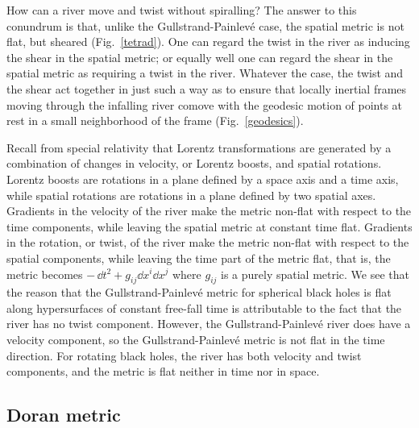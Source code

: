 \documentclass[twocolumn,showpacs,preprintnumbers,amsmath,amssymb,prb]{revtex4}
\begin{document}
How can a river move and twist without spiralling?
The answer to this conundrum is that,
unlike the Gullstrand-Painlev\'e case,
the spatial metric is not flat, but sheared
(Fig.~\ref{tetrad}).
One can regard the twist in the river
as inducing the shear in the spatial metric;
or equally well one can regard the shear in the spatial metric
as requiring a twist in the river.
Whatever the case,
the twist and the shear act together
in just such a way as to ensure that locally inertial frames
moving through the infalling river
comove with the geodesic motion of points at rest
in a small neighborhood of the frame
(Fig.~\ref{geodesics}).

Recall from special relativity
that Lorentz transformations are generated
by a combination of changes in velocity,
or Lorentz boosts,
and spatial rotations.
Lorentz boosts are rotations in a plane defined by a space axis and a time axis,
while spatial rotations are rotations in a plane defined by two spatial axes.
Gradients in the velocity of the river
make the metric non-flat with respect to the time components,
while leaving the spatial metric at constant time flat.
Gradients in the rotation, or twist, of the river
make the metric non-flat with respect to the spatial components,
while leaving the time part of the metric flat,
that is, the metric becomes $- \, \dd t^2 + g_{ij} \dd x^i \dd x^j$
where $g_{ij}$ is a purely spatial metric.
We see that the reason that the Gullstrand-Painlev\'e metric
for spherical black holes
is flat along hypersurfaces of constant free-fall time
is attributable to the fact that the river has no twist component.
However, the Gullstrand-Painlev\'e river does have a velocity component,
so the Gullstrand-Painlev\'e metric is not flat in the time direction.
For rotating black holes,
the river has both velocity and twist components,
and the metric is flat neither in time nor in space.

\subsection{Doran metric}
\end{document}
